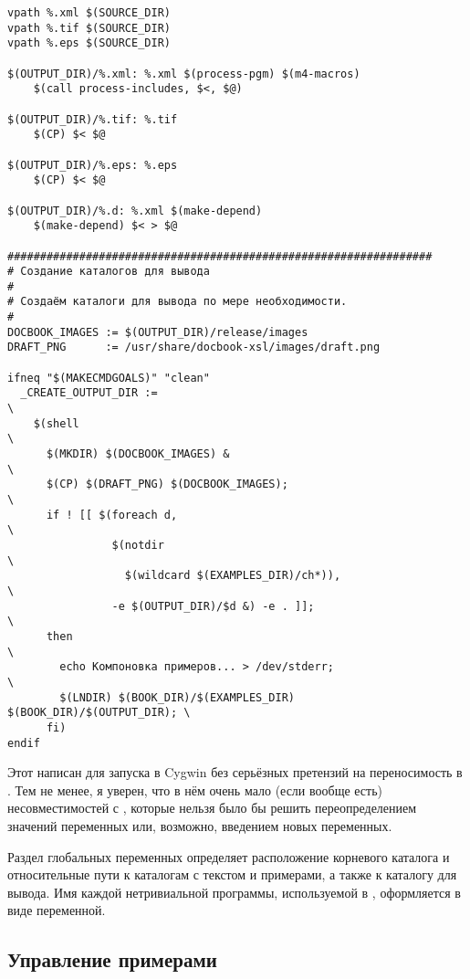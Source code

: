 {\begin{verbatim}
vpath %.xml $(SOURCE_DIR)
vpath %.tif $(SOURCE_DIR)
vpath %.eps $(SOURCE_DIR)

$(OUTPUT_DIR)/%.xml: %.xml $(process-pgm) $(m4-macros)
    $(call process-includes, $<, $@)

$(OUTPUT_DIR)/%.tif: %.tif
    $(CP) $< $@

$(OUTPUT_DIR)/%.eps: %.eps
    $(CP) $< $@

$(OUTPUT_DIR)/%.d: %.xml $(make-depend)
    $(make-depend) $< > $@

#################################################################
# Создание каталогов для вывода
#
# Создаём каталоги для вывода по мере необходимости.
#
DOCBOOK_IMAGES := $(OUTPUT_DIR)/release/images
DRAFT_PNG      := /usr/share/docbook-xsl/images/draft.png

ifneq "$(MAKECMDGOALS)" "clean"
  _CREATE_OUTPUT_DIR :=                                                 \
    $(shell                                                             \
      $(MKDIR) $(DOCBOOK_IMAGES) &                                      \
      $(CP) $(DRAFT_PNG) $(DOCBOOK_IMAGES);                             \
      if ! [[ $(foreach d,                                              \
                $(notdir                                                \
                  $(wildcard $(EXAMPLES_DIR)/ch*)),                     \
                -e $(OUTPUT_DIR)/$d &) -e . ]];                         \
      then                                                              \
        echo Компоновка примеров... > /dev/stderr;                      \
        $(LNDIR) $(BOOK_DIR)/$(EXAMPLES_DIR) $(BOOK_DIR)/$(OUTPUT_DIR); \
      fi)
endif
\end{verbatim}
}

Этот \Makefile{} написан для запуска в Cygwin без серьёзных претензий
на переносимость в \UNIX{}. Тем не менее, я уверен, что в нём очень
мало (если вообще есть) несовместимостей с \UNIX{}, которые нельзя
было бы решить переопределением значений переменных или, возможно,
введением новых переменных.

Раздел глобальных переменных определяет расположение корневого
каталога и относительные пути к каталогам с текстом и примерами, а
также к каталогу для вывода. Имя каждой нетривиальной программы,
используемой в , оформляется в виде переменной.

\subsection{Управление примерами}

